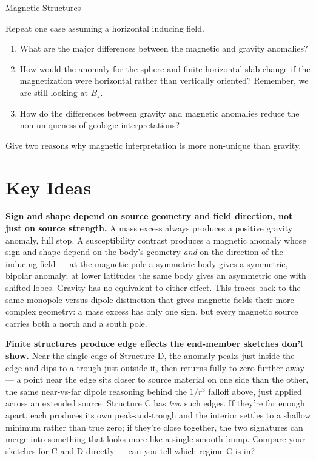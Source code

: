 \begin{activity}{Magnetic Structures}
\bigskip

\begin{questions}
  Repeat one case assuming a horizontal inducing field.

  \begin{enumerate}
    \item What are the major differences between the magnetic and gravity anomalies?
    \answerbox[2cm]
    \item How would the anomaly for the sphere and finite horizontal slab change if the magnetization were horizontal rather than vertically oriented?  Remember, we are still looking at $B_z$.
    \answerbox[3cm]
    \item How do the differences between gravity and magnetic anomalies reduce the non-uniqueness of geologic interpretations?
    \answerbox[3cm]
  \end{enumerate}

  Give two reasons why magnetic interpretation is more non-unique than gravity.

  \answerbox[3cm]
\end{questions}

\section*{Key Ideas}

\textbf{Sign and shape depend on source geometry and field direction, not just on source strength.} A mass excess always produces a positive gravity anomaly, full stop. A susceptibility contrast produces a magnetic anomaly whose sign and shape depend on the body's geometry \emph{and} on the direction of the inducing field --- at the magnetic pole a symmetric body gives a symmetric, bipolar anomaly; at lower latitudes the same body gives an asymmetric one with shifted lobes. Gravity has no equivalent to either effect. This traces back to the same monopole-versus-dipole distinction that gives magnetic fields their more complex geometry: a mass excess has only one sign, but every magnetic source carries both a north and a south pole.

\textbf{Finite structures produce edge effects the end-member sketches don't show.} Near the single edge of Structure D, the anomaly peaks just inside the edge and dips to a trough just outside it, then returns fully to zero further away --- a point near the edge sits closer to source material on one side than the other, the same near-vs-far dipole reasoning behind the $1/r^3$ falloff above, just applied across an extended source. Structure C has \emph{two} such edges. If they're far enough apart, each produces its own peak-and-trough and the interior settles to a shallow minimum rather than true zero; if they're close together, the two signatures can merge into something that looks more like a single smooth bump. Compare your sketches for C and D directly --- can you tell which regime C is in?


\end{activity}
